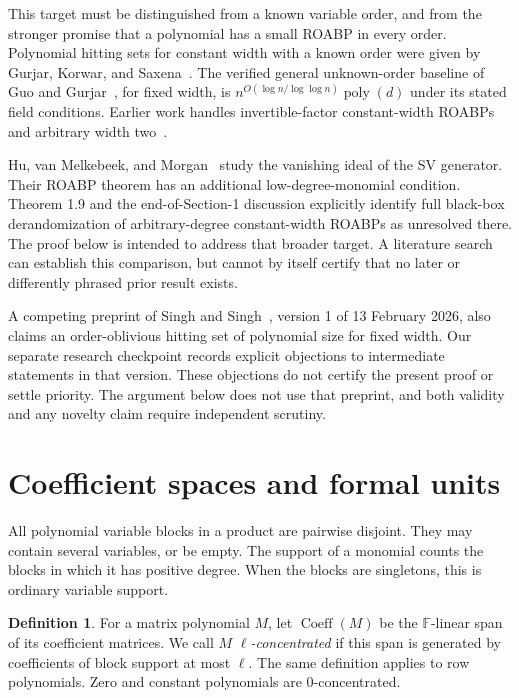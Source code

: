 \documentclass[11pt]{article}
\theoremstyle{definition}\newtheorem{definition}[theorem]{Definition}
\theoremstyle{remark}\newtheorem{remark}[theorem]{Remark}
\newcommand{\F}{\mathbb F}
\newcommand{\Coeff}{\operatorname{Coeff}}
\begin{document}
This target must be distinguished from a known variable order, and from
the stronger promise that a polynomial has a small ROABP in every order.
Polynomial hitting sets for constant width with a known order were given
by Gurjar, Korwar, and Saxena~\cite{GKS17}. The verified general unknown-order
baseline of Guo and Gurjar~\cite{GG20}, for fixed width, is
$n^{O(\log n/\log\log n)}\operatorname{poly}(d)$ under its stated field
conditions. Earlier work handles invertible-factor constant-width ROABPs
and arbitrary width two~\cite{AGKS15}.

Hu, van Melkebeek, and Morgan~\cite{HMM24} study the vanishing ideal of the
SV generator. Their ROABP theorem has an additional low-degree-monomial
condition. Theorem 1.9 and the end-of-Section-1 discussion explicitly identify full
black-box derandomization of arbitrary-degree constant-width ROABPs as
unresolved there. The proof below is intended to address that broader
target. A literature search can establish this comparison, but cannot by
itself certify that no later or differently phrased prior result exists.

A competing preprint of Singh and Singh~\cite{SS26}, version 1 of
13 February 2026, also claims an order-oblivious hitting set of polynomial
size for fixed width. Our separate research checkpoint records explicit
objections to intermediate statements in that version. These objections
do not certify the present proof or settle priority. The argument below
does not use that preprint, and both validity and any novelty claim require
independent scrutiny.

\section{Coefficient spaces and formal units}

All polynomial variable blocks in a product are pairwise disjoint. They
may contain several variables, or be empty. The support of a monomial
counts the blocks in which it has positive degree. When the blocks are
singletons, this is ordinary variable support.

\begin{definition}
For a matrix polynomial $M$, let $\Coeff(M)$ be the $\F$-linear span of its
coefficient matrices. We call $M$ \emph{$\ell$-concentrated} if this span is
generated by coefficients of block support at most $\ell$. The same
definition applies to row polynomials. Zero and constant polynomials
are $0$-concentrated.
\end{definition}
\end{document}
